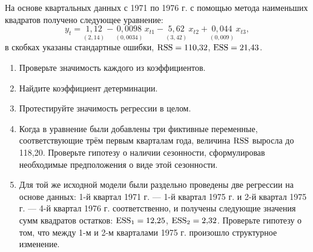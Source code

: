 На основе квартальных данных с 1971 по 1976 г. с помощью метода наименьших
квадратов получено следующее уравнение:
\[
  y_t = \underset{(2{,}14)}{1{,}12}
      - \underset{(0{,}0034)}{0{,}0098}\,x_{t1}
      - \underset{(3{,}42)}{5{,}62}\,x_{t2}
      + \underset{(0{,}009)}{0{,}044}\,x_{t3},
\]
в скобках указаны стандартные ошибки, $\mathrm{RSS} = 110{,}32$, $\mathrm{ESS} = 21{,}43$.
\begin{enumerate}[label=\asbuk*), leftmargin=2.2em, itemsep=3pt]
  \item Проверьте значимость каждого из коэффициентов.
  \item Найдите коэффициент детерминации.
  \item Протестируйте значимость регрессии в целом.
  \item Когда в уравнение были добавлены три фиктивные переменные,
        соответствующие трём первым кварталам года, величина $\mathrm{RSS}$ выросла
        до 118,20. Проверьте гипотезу о наличии сезонности, сформулировав
        необходимые предположения о виде этой сезонности.
  \item Для той же исходной модели были раздельно проведены две регрессии на
        основе данных: 1-й квартал 1971 г. — 1-й квартал 1975 г. и 2-й квартал
        1975 г. — 4-й квартал 1976 г. соответственно, и получены следующие
        значения сумм квадратов остатков: $\mathrm{ESS}_1 = 12{,}25$,
        $\mathrm{ESS}_2 = 2{,}32$. Проверьте гипотезу о том, что между 1-м и 2-м
        кварталами 1975 г. произошло структурное изменение.
\end{enumerate}

